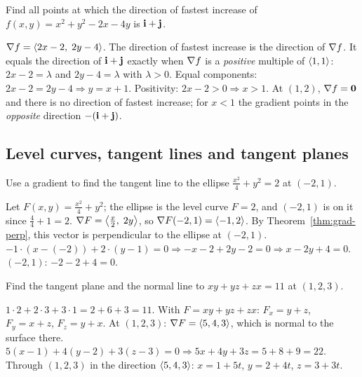 \begin{problem}[$*$]\label{prob:p23}
Find all points at which the direction of fastest increase of
$f(x,y)=x^2+y^2-2x-4y$ is $\mathbf{i}+\mathbf{j}$.
\end{problem}
\begin{solution}
 $\nabla f=\left\langle 2x-2,\;2y-4 \right\rangle$.
 The direction of fastest increase is the direction of $\nabla f$. It equals the
direction of $\mathbf{i}+\mathbf{j}$ exactly when $\nabla f$ is a \emph{positive} multiple of $\left\langle 1,1 \right\rangle$:
$2x-2=\lambda$ and $2y-4=\lambda$ with $\lambda>0$.
 Equal components: $2x-2=2y-4\Rightarrow y=x+1$. Positivity: $2x-2>0\Rightarrow x>1$.
 At $(1,2)$, $\nabla f=\mathbf{0}$ and there is no direction of fastest increase; for
$x<1$ the gradient points in the \emph{opposite} direction $-(\mathbf{i}+\mathbf{j})$.
\end{solution}

\subsection{Level curves, tangent lines and tangent planes}

\begin{problem}\label{prob:p20}
Use a gradient to find the tangent line to the ellipse $\frac{x^2}{4}+y^2=2$
at $(-2,1)$.
\end{problem}
\begin{solution}
 Let $F(x,y)=\frac{x^2}{4}+y^2$; the ellipse is the level curve
$F=2$, and $(-2,1)$ is on it since $\frac44+1=2$.
 $\nabla F=\left\langle \frac x2,\;2y \right\rangle$, so $\nabla F(-2,1)=\left\langle -1,2 \right\rangle$. By
Theorem~\ref{thm:grad-perp}, this vector is perpendicular to the ellipse at $(-2,1)$.
$-1\cdot(x-(-2))+2\cdot(y-1)=0\Rightarrow-x-2+2y-2=0\Rightarrow x-2y+4=0$.
 $(-2,1)$: $-2-2+4=0$.\checkok
{}
\end{solution}

\begin{problem}\label{prob:p21}
Find the tangent plane and the normal line to $xy+yz+zx=11$ at $(1,2,3)$.
\end{problem}
\begin{solution}
 $1\cdot2+2\cdot3+3\cdot1=2+6+3=11$.\checkok
{} With $F=xy+yz+zx$: $F_x=y+z$, $F_y=x+z$, $F_z=y+x$. At $(1,2,3)$:
$\nabla F=\left\langle 5,4,3 \right\rangle$, which is normal to the surface there.
 $5(x-1)+4(y-2)+3(z-3)=0\Rightarrow5x+4y+3z=5+8+9=22$.
 Through $(1,2,3)$ in the direction $\left\langle 5,4,3 \right\rangle$: $x=1+5t$, $y=2+4t$, $z=3+3t$.
\end{solution}

